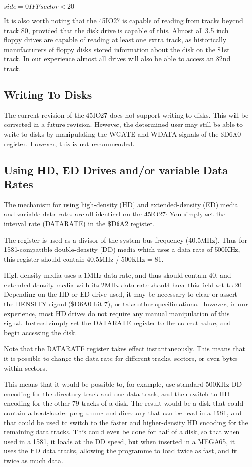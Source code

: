 $side = 0 IFF sector < 20$

It is also worth noting that the 45IO27 is capable of reading from
tracks beyond track 80, provided that the disk drive is capable of
this.  Almost all 3.5 inch floppy drives are capable of reading at
least one extra track, as historically manufacturers of floppy disks
stored information about the disk on the 81st track.  In our
experience almost all drives will also be able to access an 82nd
track.


\subsection{Writing To Disks}

The current revision of the 45IO27 does not support writing to disks.
This will be corrected in a future revision.  However, the determined
user may still be able to write to disks by manipulating the WGATE and
WDATA signals of the \$D6A0 register.  However, this is not
recommended.

\subsection{Using HD, ED Drives and/or variable Data Rates}

The mechanism for using high-density (HD) and extended-density (ED)
media and variable data rates are all identical on the 45IO27:  You
simply set the interval rate (DATARATE) in the \$D6A2 register.

The register is used as a divisor of the system bus frequency
(40.5MHz).  Thus for 1581-compatible double-density (DD) media which
uses a data rate of 500KHz, this register should contain 40.5MHz / 500KHz = 81.

High-density media uses a 1MHz data rate, and thus should contain 40,
and extended-density media with its 2MHz data rate should have this
field set to 20.  Depending on the HD or ED drive used, it may be
necessary to clear or assert the DENSITY signal (\$D6A0 bit 7), or
take other specific ations.  However, in our experience, most HD
drives do not require any manual manipulation of this signal: Instead
simply set the DATARATE register to the correct value, and begin
accessing the disk.

Note that the DATARATE register takes effect instantaneously.  This
means that it is possible to change the data rate for different
tracks, sectors, or even bytes within sectors.

This means that it
would be possible to, for example, use standard 500KHz DD encoding for
the directory track and one data track, and then switch to HD encoding for the other 79
tracks of a disk. The result would be a disk that could contain a
boot-loader programme and directory that can be read in a 1581, and
that could be used to switch to the faster and higher-density HD
encoding for the remaining data tracks.  This could even be done for
half of a disk, so that when used in a 1581, it loads at the DD speed,
but when inserted in a MEGA65, it uses the HD data tracks, allowing
the programme to load twice as fast, and fit twice as much data.

